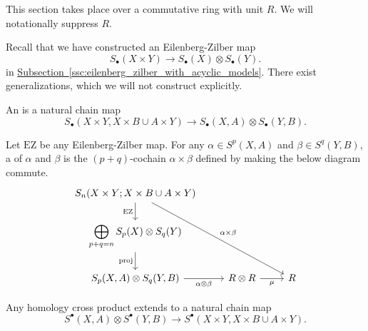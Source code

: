 \documentclass[main.tex]{subfiles}
\begin{document}
This section takes place over a commutative ring with unit \(R\). We will notationally suppress \(R\).

Recall that we have constructed an Eilenberg-Zilber map
\begin{equation*}
  S_{\bullet}(X \times Y) \to S_{\bullet}(X) \otimes S_{\bullet}(Y).
\end{equation*}
in \hyperref[ssc:eilenberg_zilber_with_acyclic_models]{Subsection~\ref*{ssc:eilenberg_zilber_with_acyclic_models}}. There exist generalizations, which we will not construct explicitly.

\begin{definition}
  \label{def:eilenberg_zilber_map}
  An  is a natural chain map
  \begin{equation*}
    S_{\bullet}(X \times Y, X \times B \cup A \times Y) \to S_{\bullet}(X, A) \otimes S_{\bullet}(Y, B).
  \end{equation*}
\end{definition}

\begin{definition}
  \label{def:cohomology_cross_product}
  Let \(\mathrm{EZ}\) be any Eilenberg-Zilber map. For any \(\alpha \in S^{p}(X, A)\) and \(\beta \in S^{q}(Y, B)\), a  of \(\alpha\) and \(\beta\) is the \((p + q)\)-cochain \(\alpha \times \beta\) defined by making the below diagram commute.
  \begin{equation*}
    \begin{tikzcd}
      S_{n}(X \times Y; X \times B \cup A \times Y)
      \arrow[ddrr, "\alpha \times \beta"]
      \arrow[d, swap, "\mathrm{EZ}"]
      \\
      \displaystyle\bigoplus\limits_{p + q = n} S_{p}(X) \otimes S_{q}(Y)
      \arrow[d, swap, "\mathrm{proj}"]
      \\
      S_{p}(X, A) \otimes S_{q}(Y, B)
      \arrow[r, swap, "\alpha \otimes \beta"]
      & R \otimes R
      \arrow[r, swap, "\mu"]
      & R
    \end{tikzcd}
  \end{equation*}
\end{definition}

\begin{fact}
  \label{fact:homology_cross_product_is_natural_chain_map}
  Any homology cross product extends to a natural chain map
  \begin{equation*}
    S^{\bullet}(X, A) \otimes S^{\bullet}(Y, B) \to S^{\bullet}(X \times Y, X \times B \cup A \times Y).
  \end{equation*}
\end{fact}
\end{document}
